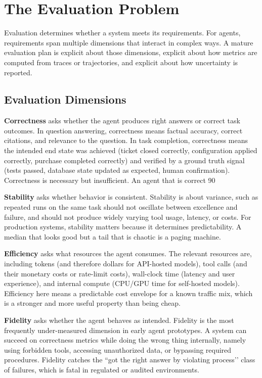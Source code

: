 \section{The Evaluation Problem}

Evaluation determines whether a system meets its requirements. For agents, requirements span multiple dimensions that interact in complex ways. A mature evaluation plan is explicit about those dimensions, explicit about how metrics are computed from traces or trajectories, and explicit about how uncertainty is reported.

\subsection{Evaluation Dimensions}

\textbf{Correctness} asks whether the agent produces right answers or correct task outcomes. In question answering, correctness means factual accuracy, correct citations, and relevance to the question. In task completion, correctness means the intended end state was achieved (ticket closed correctly, configuration applied correctly, purchase completed correctly) and verified by a ground truth signal (tests passed, database state updated as expected, human confirmation). Correctness is necessary but insufficient. An agent that is correct 90%

\textbf{Stability} asks whether behavior is consistent. Stability is about variance, such as repeated runs on the same task should not oscillate between excellence and failure, and should not produce widely varying tool usage, latency, or costs. For production systems, stability matters because it determines predictability. A median that looks good but a tail that is chaotic is a paging machine.

\textbf{Efficiency} asks what resources the agent consumes. The relevant resources are, including tokens (and therefore dollars for API-hosted models), tool calls (and their monetary costs or rate-limit costs), wall-clock time (latency and user experience), and internal compute (CPU/GPU time for self-hosted models). Efficiency here means a predictable cost envelope for a known traffic mix, which is a stronger and more useful property than being cheap.

\textbf{Fidelity} asks whether the agent behaves as intended. Fidelity is the most frequently under-measured dimension in early agent prototypes. A system can succeed on correctness metrics while doing the wrong thing internally, namely using forbidden tools, accessing unauthorized data, or bypassing required procedures. Fidelity catches the ``got the right answer by violating process’’ class of failures, which is fatal in regulated or audited environments.

